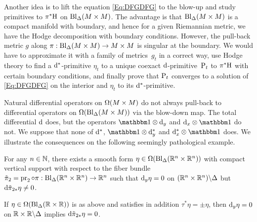 \documentclass[\MainFolder/Text.tex]{subfiles}
\begin{document}
Another idea is to lift the equation \eqref{Eq:DFGDFG} to the blow-up and study primitives to $\pi^*\mathrm{H}$ on $\mathrm{Bl}_\Delta(M\times M)$. The advantage is that $\mathrm{Bl}_\Delta(M\times M)$ is a compact manifold with boundary, and hence for a given Riemannian metric, we have the Hodge decomposition with boundary conditions.  However, the pull-back metric $g$ along $\pi : \mathrm{Bl}_\Delta(M\times M)\rightarrow M\times M$ is singular at the boundary. We would have to approximate it with a family of metrics~$g_t$ in a correct way, use Hodge theory to find a $\mathrm{d}^*$-primitive $\eta_t$ to a unique coexact $\mathrm{d}$-primitive~$\mathrm{P}_t$ to $\pi^*\mathrm{H}$ with certain boundary conditions, and finally prove that $\mathrm{P}_t$ converges to a solution of \eqref{Eq:DFGDFG} on the interior and $\eta_t$ to its $\mathrm{d}^*$-primitive.

Natural differential operators on $\Omega(M\times M)$ do not always pull-back to differential operators on $\Omega(\mathrm{Bl}_\Delta(M\times M))$ via the blow-down map. The total differential $\mathrm{d}$ does, but the operators $\Id \otimes \Dd_y$ and $\Dd_x \otimes \Id$ do not. We suppose that none of $\mathrm{d}^*$, $\Id \otimes \CoDd_y$ and $\CoDd_x \otimes \Id$ does. We illustrate the consequences on the following seemingly pathological example.
%
\begin{Proposition}\label{Prop:PatEm}
For any $n\in \mathbb{N}$, there exists a smooth form $\eta \in \Omega(\mathrm{Bl}_\Delta(\mathbb{R}^n\times \mathbb{R}^n))$ with compact vertical support with respect to the fiber bundle $\tilde{\pi}_2 = \operatorname{\mathrm{pr}}_2 \circ \pi : \mathrm{Bl}_\Delta(\mathbb{R}^n\times \mathbb{R}^n) \rightarrow \mathbb{R}^n$ such that $\mathrm{d}_y \eta = 0$ on $(\mathbb{R}^n\times \mathbb{R}^n)\backslash \Delta$ but $\mathrm{d} \tilde{\pi}_{2*}\eta \neq 0$.

If $\eta \in \Omega(\mathrm{Bl}_\Delta(\mathbb{R}\times \mathbb{R}))$ is as above and satisfies in addition $\tau^* \eta = \pm \eta$, then $\mathrm{d}_y \eta = 0$ on $\mathbb{R}\times \mathbb{R} \backslash \Delta$ implies $\mathrm{d} \tilde{\pi}_{2*}\eta = 0$.
\end{Proposition}
\end{document}
